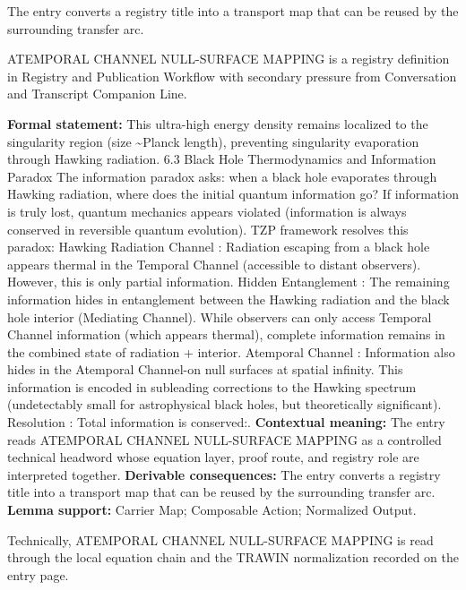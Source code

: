 The entry converts a registry title into a transport map that can be reused by the surrounding transfer arc.
\clearpage


\begingroup\small
{}
ATEMPORAL CHANNEL NULL-SURFACE MAPPING is a registry definition in Registry and Publication Workflow with secondary pressure from Conversation and Transcript Companion Line.

\begingroup\footnotesize\setlength{\emergencystretch}{3em}\sloppy
\textbf{Formal statement:} This ultra-high energy density remains localized to the singularity region (size \textasciitilde{}Planck length), preventing singularity evaporation through Hawking radiation. 6.3 Black Hole Thermodynamics and Information Paradox The information paradox asks: when a black hole evaporates through Hawking radiation, where does the initial quantum information go? If information is truly lost, quantum mechanics appears violated (information is always conserved in reversible quantum evolution). TZP framework resolves this paradox: Hawking Radiation Channel : Radiation escaping from a black hole appears thermal in the Temporal Channel (accessible to distant observers). However, this is only partial information. Hidden Entanglement : The remaining information hides in entanglement between the Hawking radiation and the black hole interior (Mediating Channel). While observers can only access Temporal Channel information (which appears thermal), complete information remains in the combined state of radiation + interior. Atemporal Channel : Information also hides in the Atemporal Channel-on null surfaces at spatial infinity. This information is encoded in subleading corrections to the Hawking spectrum (undetectably small for astrophysical black holes, but theoretically significant). Resolution : Total information is conserved:. \textbf{Contextual meaning:} The entry reads ATEMPORAL CHANNEL NULL-SURFACE MAPPING as a controlled technical headword whose equation layer, proof route, and registry role are interpreted together. \textbf{Derivable consequences:} The entry converts a registry title into a transport map that can be reused by the surrounding transfer arc. \textbf{Lemma support:} Carrier Map; Composable Action; Normalized Output.\par
\endgroup

Technically, ATEMPORAL CHANNEL NULL-SURFACE MAPPING is read through the local equation chain and the TRAWIN normalization recorded on the entry page.

